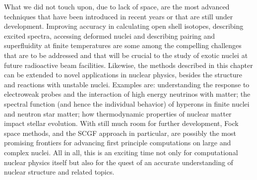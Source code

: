 What we did not touch upon, due to lack of space, are the most advanced techniques that have been introduced in recent years or that are still under development. Improving accuracy in calculating open shell isotopes, describing excited spectra,  accessing deformed nuclei and describing pairing and superfluidity at finite temperatures are some among the compelling challenges that are to be addressed and that will be crucial to the study of exotic nuclei at future radioactive beam facilities.
%
Likewise, the methods described in this chapter can be extended to novel applications in nuclear physics,  besides the structure and reactions with unstable nuclei. Examples are: understanding the response to electroweak probes and the interaction of high energy neutrinos with matter; the spectral function (and hence the individual behavior) of hyperons in finite nuclei and neutron star matter; how thermodynamic properties of nuclear matter impact stellar evolution.
With still much room for further development, Fock space methods, and the SCGF approach in particular, are possibly the most promising frontiers for advancing first principle computations on large and complex nuclei. All in all, this is an exciting time not only for computational nuclear physics itself  but also for the quest of an accurate understanding of nuclear structure and related topics. 



